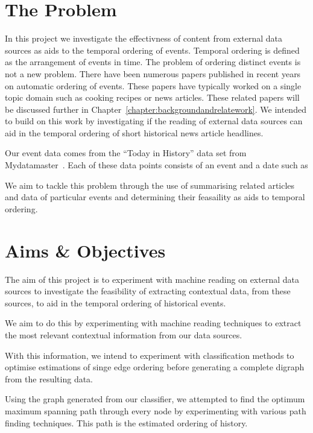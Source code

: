 \documentclass[bsc,frontabs,twoside,singlespacing,parskip,deptreport]{infthesis}     %
\begin{document}
\section{The Problem}
In this project we investigate the effectivness of content from external data sources as aids to the temporal
ordering of events. Temporal ordering is defined as the arrangement of events in time.
The problem of ordering distinct events is not a new problem. There have been numerous papers published
in recent years on automatic ordering of events. These papers have typically worked on a single
topic domain such as cooking recipes or news articles. These related papers will be discussed further in Chapter~\ref{chapter:backgroundandrelatework}.
We intended to build on this work by
investigating if the reading of external data sources can aid in the temporal ordering of short
historical news article headlines.

Our event data comes from the ``Today in History'' data set from Mydatamaster~\cite{mydatamaster}. Each of these data points consists
of an event and a date such as
\begin{equation}
  [ \text{``Alaska becomes 49th State''}, \text{``1959-01-01''} ]\nonumber
\end{equation}


We aim to tackle this problem through the use of summarising related articles and data of particular
events and determining their feasaility as aids to temporal ordering. 

\section{Aims \& Objectives}
The aim of this project is to experiment with machine reading on external data sources to
investigate the feasibility of extracting contextual data, from these sources, to aid in the
temporal ordering of historical events.

We aim to do this by experimenting with machine reading techniques to extract the most
relevant contextual information from our data sources.

With this information, we intend to experiment with classification methods to optimise estimations
of singe edge ordering before generating a complete digraph from the resulting data.

Using the graph generated from our classifier, we attempted to find the optimum maximum spanning path
through every node by experimenting with various path finding techniques.
This path is the estimated ordering of history.
\end{document}
